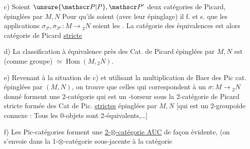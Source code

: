 c) Soient $\unsure{\mathscr P|P},\mathscr P'$ deux catégories de Picard, épinglées par $M,N$ Pour qu'ils soient  (avec leur épinglage) il f. et s. que les applications $\sigma_{\mathscr P},\sigma_{\mathscr P'}\colon M\longrightarrow {}_2N$ soient les . La catégorie des équivalences est alors  catégorie de Picard \uline{stricte}

d) La classification à équivalence près des Cat. de Picard épinglées par $M,N$ est (comme groupe) $\simeq\operatorname{Hom}(M,{}_2N)$.

e) Revenant à la situation de c) et utilisant la multiplication de Baer des Pic cat. épinglées par $(M,N)$, on trouve que  celles qui correspondent à un $\sigma\colon M\longrightarrow{}_2N$ donné forment une 2-catégorie qui est un -torseur sous la 2-catégorie de Picard stricte formée des Cat de Pic. \uline{strictes} épinglées par $M,N$  [qui est un 2-groupoïde connexe : Tous les 0-objets sont 2-équivalents,\ldots] 

f) Les Pic-catégories forment une \uline{2-$\otimes$-catégorie  AUC} de façon évidente,  (on s'envoie dans  la 1-$\otimes$-catégorie  sous-jacente à la catégorie 

